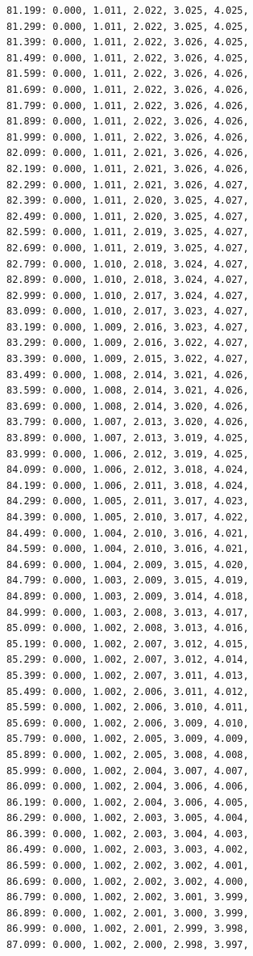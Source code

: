 \documentclass[12pt, a4paper]{article}
\begin{document}
\begin{scriptsize}
\begin{ttfamily}
\begin{lstlisting}
81.199: 0.000, 1.011, 2.022, 3.025, 4.025, 
81.299: 0.000, 1.011, 2.022, 3.025, 4.025, 
81.399: 0.000, 1.011, 2.022, 3.026, 4.025, 
81.499: 0.000, 1.011, 2.022, 3.026, 4.025, 
81.599: 0.000, 1.011, 2.022, 3.026, 4.026, 
81.699: 0.000, 1.011, 2.022, 3.026, 4.026, 
81.799: 0.000, 1.011, 2.022, 3.026, 4.026, 
81.899: 0.000, 1.011, 2.022, 3.026, 4.026, 
81.999: 0.000, 1.011, 2.022, 3.026, 4.026, 
82.099: 0.000, 1.011, 2.021, 3.026, 4.026, 
82.199: 0.000, 1.011, 2.021, 3.026, 4.026, 
82.299: 0.000, 1.011, 2.021, 3.026, 4.027, 
82.399: 0.000, 1.011, 2.020, 3.025, 4.027, 
82.499: 0.000, 1.011, 2.020, 3.025, 4.027, 
82.599: 0.000, 1.011, 2.019, 3.025, 4.027, 
82.699: 0.000, 1.011, 2.019, 3.025, 4.027, 
82.799: 0.000, 1.010, 2.018, 3.024, 4.027, 
82.899: 0.000, 1.010, 2.018, 3.024, 4.027, 
82.999: 0.000, 1.010, 2.017, 3.024, 4.027, 
83.099: 0.000, 1.010, 2.017, 3.023, 4.027, 
83.199: 0.000, 1.009, 2.016, 3.023, 4.027, 
83.299: 0.000, 1.009, 2.016, 3.022, 4.027, 
83.399: 0.000, 1.009, 2.015, 3.022, 4.027, 
83.499: 0.000, 1.008, 2.014, 3.021, 4.026, 
83.599: 0.000, 1.008, 2.014, 3.021, 4.026, 
83.699: 0.000, 1.008, 2.014, 3.020, 4.026, 
83.799: 0.000, 1.007, 2.013, 3.020, 4.026, 
83.899: 0.000, 1.007, 2.013, 3.019, 4.025, 
83.999: 0.000, 1.006, 2.012, 3.019, 4.025, 
84.099: 0.000, 1.006, 2.012, 3.018, 4.024, 
84.199: 0.000, 1.006, 2.011, 3.018, 4.024, 
84.299: 0.000, 1.005, 2.011, 3.017, 4.023, 
84.399: 0.000, 1.005, 2.010, 3.017, 4.022, 
84.499: 0.000, 1.004, 2.010, 3.016, 4.021, 
84.599: 0.000, 1.004, 2.010, 3.016, 4.021, 
84.699: 0.000, 1.004, 2.009, 3.015, 4.020, 
84.799: 0.000, 1.003, 2.009, 3.015, 4.019, 
84.899: 0.000, 1.003, 2.009, 3.014, 4.018, 
84.999: 0.000, 1.003, 2.008, 3.013, 4.017, 
85.099: 0.000, 1.002, 2.008, 3.013, 4.016, 
85.199: 0.000, 1.002, 2.007, 3.012, 4.015, 
85.299: 0.000, 1.002, 2.007, 3.012, 4.014, 
85.399: 0.000, 1.002, 2.007, 3.011, 4.013, 
85.499: 0.000, 1.002, 2.006, 3.011, 4.012, 
85.599: 0.000, 1.002, 2.006, 3.010, 4.011, 
85.699: 0.000, 1.002, 2.006, 3.009, 4.010, 
85.799: 0.000, 1.002, 2.005, 3.009, 4.009, 
85.899: 0.000, 1.002, 2.005, 3.008, 4.008, 
85.999: 0.000, 1.002, 2.004, 3.007, 4.007, 
86.099: 0.000, 1.002, 2.004, 3.006, 4.006, 
86.199: 0.000, 1.002, 2.004, 3.006, 4.005, 
86.299: 0.000, 1.002, 2.003, 3.005, 4.004, 
86.399: 0.000, 1.002, 2.003, 3.004, 4.003, 
86.499: 0.000, 1.002, 2.003, 3.003, 4.002, 
86.599: 0.000, 1.002, 2.002, 3.002, 4.001, 
86.699: 0.000, 1.002, 2.002, 3.002, 4.000, 
86.799: 0.000, 1.002, 2.002, 3.001, 3.999, 
86.899: 0.000, 1.002, 2.001, 3.000, 3.999, 
86.999: 0.000, 1.002, 2.001, 2.999, 3.998, 
87.099: 0.000, 1.002, 2.000, 2.998, 3.997, 

\end{lstlisting}
\end{ttfamily}
\end{scriptsize}
\end{document}
